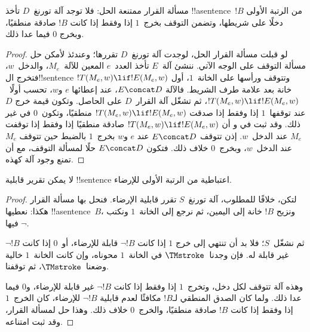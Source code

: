 \documentclass[../../../include/open-logic-section]{subfiles}
\begin{document}

\begin{thm}
مسألة القرار ممتنعة الحل: فلا توجد آلة تورنغ~$D$ تأخذ
!!a{sentence}~$!B$ من الرتبة الأولى دخلًا على شريطها، وتضمن
التوقف بخرج~$1$ إذا وفقط إذا كانت $!B$ صادقة منطقيًا، وبخرج
$0$ فيما عدا ذلك.
\end{thm}

\begin{proof}
لو قبلت مسألة القرار الحل، لوجدت آلة تورنغ~$D$ تقررها؛ وعندئذ
لأمكن حل مسألة التوقف على الوجه الآتي. ننشئ آلة~$E$ تأخذ
  العدد~$e$ المعين للآلة~$M_e$، والدخل~$w$، فتخرج
  ال!!{sentence} $!T(M_e,w)\lif !E(M_e,w)$ وتتوقف ورأسها على
  الخانة~$1$، أول خانة بعد علامة طرف الشريط. فالآلة $E\concat D$، عند إعطائها
$e$ و$w$، تحسب أولًا~$!T(M_e,w)\lif !E(M_e,w)$، ثم تشغّل
آلة القرار~$D$ على الحاصل. وتكون قيمة خرج $D$ عند توقفها~$1$
إذا وفقط إذا صدقت $!T(M_e,w)\lif !E(M_e,w)$ منطقيًا،
وتكون~$0$ في غير ذلك. وقد ثبت في 
و أن
$!T(M_e,w)\lif !E(M_e,w)$ صادقة منطقيًا إذا وفقط إذا توقفت
$M_e$ عند الدخل~$w$. إذن تتوقف $E\concat D$ عند
$e$ و$w$ بخرج~$1$ بالضبط حين تتوقف $M_e$ عند الدخل~$w$،
وبخرج~$0$ خلاف ذلك. فتكون $E\concat D$ حلًا لمسألة التوقف،
  مع أن  تمنع وجود آلة كهذه.
\end{proof}

\begin{cor}%
لا يمكن تقرير قابلية !!{sentence} اعتباطية من الرتبة الأولى
للإرضاء.
\end{cor}

\begin{proof}
  لتكن، خلافًا للمطلوب، آلة تورنغ~$S$ تقرر قابلية الإرضاء.
  فنحل بها مسألة القرار هكذا: نعطيها !!a{sentence}~$B$،
  ونزيح $!B$ خانة إلى اليمين، ثم نرجع إلى الخانة~$1$
  ونكتب فيها $\lnot$.

  ثم نشغّل~$S$؛ فلا بد أن تنتهي إلى خرج $1$ إذا كانت
  $\lnot !B$ قابلة للإرضاء، أو~$0$ إذا كانت $\lnot !B$
  غير قابلة له. فإن وجدنا~$\TMstroke$ في الخانة~$1$
  محوناه، وإن كانت الخانة~$1$ خالية وضعنا~$\TMstroke$،
  ثم توقفنا.

  وهذه آلة تتوقف لكل دخل، وتخرج~$1$ إذا وفقط إذا كانت
  $\lnot !B$ غير قابلة للإرضاء، و$0$ فيما عدا ذلك.
  ولما كان الصدق المنطقي لـ$!B$ مكافئًا لعدم قابلية
  $\lnot !B$ للإرضاء، كان الخرج~$1$ إذا وفقط إذا كانت
  $!B$ صادقة منطقيًا، والخرج~$0$ خلاف ذلك. وهذا حل لمسألة
  القرار، وقد ثبت امتناعه.
\end{proof}
\end{document}
